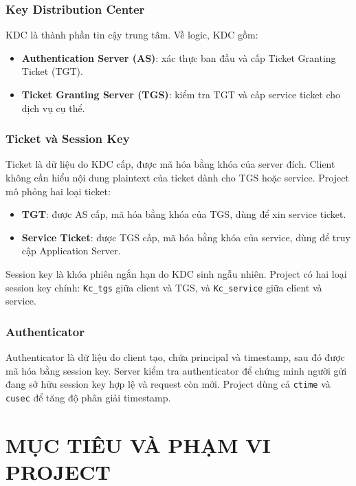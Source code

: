 \documentclass[12pt]{article}
\begin{document}
\subsubsection{Key Distribution Center}

KDC là thành phần tin cậy trung tâm. Về logic, KDC gồm:
\begin{itemize}
    \item \textbf{Authentication Server (AS)}: xác thực ban đầu và cấp Ticket Granting Ticket (TGT).
    \item \textbf{Ticket Granting Server (TGS)}: kiểm tra TGT và cấp service ticket cho dịch vụ cụ thể.
\end{itemize}

\subsubsection{Ticket và Session Key}

Ticket là dữ liệu do KDC cấp, được mã hóa bằng khóa của server đích. Client không cần hiểu nội dung plaintext của ticket dành cho TGS hoặc service. Project mô phỏng hai loại ticket:
\begin{itemize}
    \item \textbf{TGT}: được AS cấp, mã hóa bằng khóa của TGS, dùng để xin service ticket.
    \item \textbf{Service Ticket}: được TGS cấp, mã hóa bằng khóa của service, dùng để truy cập Application Server.
\end{itemize}

Session key là khóa phiên ngắn hạn do KDC sinh ngẫu nhiên. Project có hai loại session key chính: \texttt{Kc\_tgs} giữa client và TGS, và \texttt{Kc\_service} giữa client và service.

\subsubsection{Authenticator}

Authenticator là dữ liệu do client tạo, chứa principal và timestamp, sau đó được mã hóa bằng session key. Server kiểm tra authenticator để chứng minh người gửi đang sở hữu session key hợp lệ và request còn mới. Project dùng cả \texttt{ctime} và \texttt{cusec} để tăng độ phân giải timestamp.

\section{MỤC TIÊU VÀ PHẠM VI PROJECT}
\end{document}
